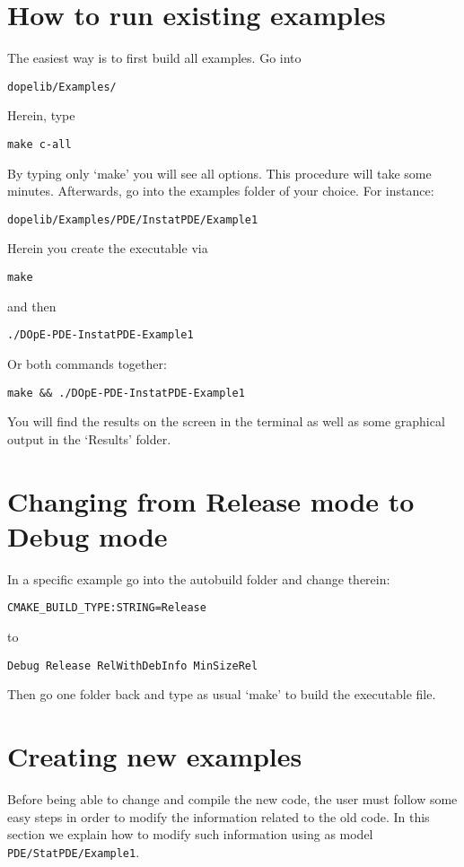 \section{How to run existing examples}
The easiest way is to first build all examples. Go into 
\begin{lstlisting}
dopelib/Examples/
\end{lstlisting}
Herein, type 
\begin{lstlisting}
make c-all
\end{lstlisting}
By typing only `make' you will see all options.
This procedure will take some minutes. Afterwards,
go into the examples folder of your choice. For instance:
\begin{lstlisting}
dopelib/Examples/PDE/InstatPDE/Example1
\end{lstlisting}
Herein you create the executable via
\begin{lstlisting}
make 
\end{lstlisting}
and then 
\begin{lstlisting}
./DOpE-PDE-InstatPDE-Example1 
\end{lstlisting}
Or both commands together:
\begin{lstlisting}
make && ./DOpE-PDE-InstatPDE-Example1 
\end{lstlisting}
You will find the results on the screen in the terminal as well
as some graphical output in the `Results' folder.

\section{Changing from Release mode to Debug mode}
In a specific example go into the autobuild folder 
and change therein:
\begin{lstlisting}
CMAKE_BUILD_TYPE:STRING=Release
\end{lstlisting}
to 
\begin{lstlisting}
Debug Release RelWithDebInfo MinSizeRel
\end{lstlisting}
Then go one folder back and type as usual `make' to build the executable file.



\section{Creating new examples}
\label{getting_started}
Before being able to change and compile the new code, the user must 
follow some easy steps in order to modify the information related to the old code. In 
this section we explain how to modify such information using as model 
\texttt{PDE/StatPDE/Example1}.

